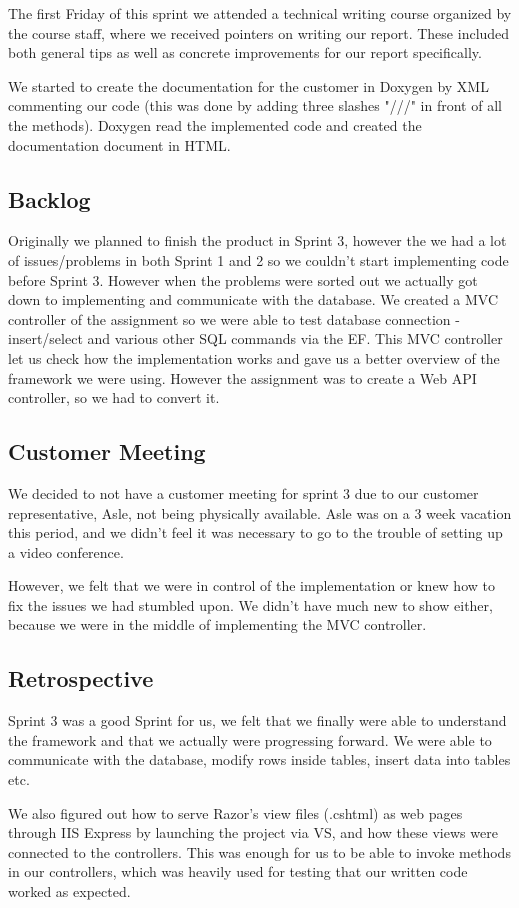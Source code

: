 The first Friday of this sprint we attended a technical writing course organized by the course staff, where we received pointers on writing our report. These included both general tips as well as concrete improvements for our report specifically.

We started to create the documentation for the customer in Doxygen by XML commenting our code (this was done by adding three slashes "///" in front of all the methods). Doxygen read the implemented code and created the documentation document in HTML. 

\subsection{Backlog}
Originally we planned to finish the product in Sprint 3, however the we had a lot of issues/problems in both Sprint 1 and 2 so we couldn't start implementing code before Sprint 3. However when the problems were sorted out we actually got down to implementing and communicate with the database. We created a MVC controller of the assignment so we were able to test database connection - insert/select and various other SQL commands via the EF. This MVC controller let us check how the implementation works and gave us a better overview of the framework we were using. However the assignment was to create a Web API controller, so we had to convert it.


\subsection{Customer Meeting}
We decided to not have a customer meeting for sprint 3 due to our customer representative, Asle, not being physically available. Asle was on a 3 week vacation this period, and we didn't feel it was necessary to go to the trouble of setting up a video conference.

However, we felt that we were in control of the implementation or knew how to fix the issues we had stumbled upon. We didn't have much new to show either, because we were in the middle of implementing the MVC controller.

\subsection{Retrospective}
Sprint 3 was a good Sprint for us, we felt that we finally were able to understand the framework and that we actually were progressing forward. We were able to communicate with the database, modify rows inside tables, insert data into tables etc.

We also figured out how to serve Razor's view files (.cshtml) as web pages through IIS Express by launching the project via VS, and how these views were connected to the controllers. This was enough for us to be able to invoke methods in our controllers, which was heavily used for testing that our written code worked as expected.